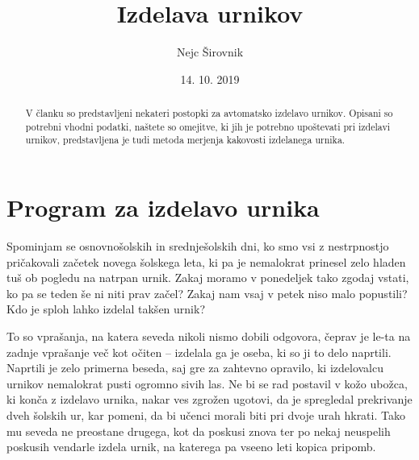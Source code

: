 \documentclass[a4paper,10pt]{article}
\begin{document}
   
   
   \title{Izdelava urnikov} 
   \author{Nejc Širovnik}
   \date{14. 10. 2019}
\maketitle
   
   
\begin{abstract}
   V članku so predstavljeni nekateri postopki za avtomatsko izdelavo urnikov. Opisani so
   potrebni vhodni podatki, naštete so omejitve, ki jih je potrebno upoštevati pri izdelavi
   urnikov, predstavljena je tudi metoda merjenja kakovosti izdelanega urnika.
\end{abstract}
   
\section{   Program za izdelavo urnika}
   
   Spominjam se osnovnošolskih in srednješolskih dni, ko smo vsi z nestrpnostjo pričakovali
   začetek novega šolskega leta, ki pa je nemalokrat prinesel zelo hladen tuš ob pogledu na
   natrpan urnik. Zakaj moramo v ponedeljek tako zgodaj vstati, ko pa se teden še ni niti
   prav začel? Zakaj nam vsaj v petek niso malo popustili? Kdo je sploh lahko izdelal
   takšen urnik?
   
   To so vprašanja, na katera seveda nikoli nismo dobili odgovora, čeprav je le-ta na zadnje
   vprašanje več kot očiten -- izdelala ga je oseba, ki so ji to delo naprtili. Naprtili je
   zelo primerna beseda, saj gre za zahtevno opravilo, ki izdelovalcu urnikov nemalokrat
   pusti ogromno sivih las. Ne bi se rad postavil v kožo ubožca, ki konča z izdelavo urnika,
   nakar ves zgrožen ugotovi, da je spregledal prekrivanje dveh šolskih ur, kar pomeni, da
   bi učenci morali biti pri dvoje urah hkrati. Tako mu seveda ne preostane drugega, kot da
   poskusi znova ter po nekaj neuspelih poskusih vendarle izdela urnik, na katerega pa vseeno
   leti kopica pripomb.
   
\end{document}
